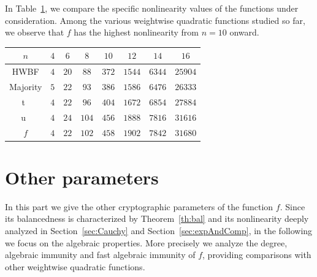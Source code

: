 \documentclass[11pt]{llncs}
\begin{document}
In Table~\ref{table:comparisonsNL}, we compare the specific nonlinearity values of the functions under consideration. Among the various weightwise quadratic functions studied so far, we observe that $f$ has the highest nonlinearity from $n=10$ onward.



\begin{table}[h]
	\centering
	\begin{tabular}{|c| c|c|c|c| c|c|c|}
		\hline
		$n$ & $4$  & $6$  & $8$  &  $10$ & $12$ & $14$ & $16$  \\
	\hline	
    	HWBF   & $4$  & $20$  & $88$  &  $372$ & $1544$ & $6344$ & $25904$  \\  	
		\hline
Majority   & $5$  & $22$  & $93$  &  $386$ & $1586$ & $6476$ & $26333$  \\
\hline
    	t~\cite{DAM:MeaOza24}   & $4$  & $22$  & $96$  &  $404$ & $1672$ & $6854$ & $27884$\\
\hline	
    	u~\cite{DAM:MeaOza24}   & $4$  & $24$  & $104$  &  $456$ & $1888$ & $7816$ & $31616$ \\
\hline				
		
		$f$  & $4$  & $22$  & $102$  &  $458$ & $1902$ & $7842$ & $31680$\\
\hline
	\end{tabular}
	\label{table:comparisonsNL}
\end{table}





\section{Other parameters}\label{sec:otherParameters}

In this part we give the other cryptographic parameters of the function $f$. Since its balancedness is characterized by Theorem~\ref{th:bal} and its nonlinearity deeply analyzed in Section~\ref{sec:Cauchy} and Section~\ref{sec:expAndComp}, in the following we focus on the algebraic properties. More precisely we analyze the degree, algebraic immunity and fast algebraic immunity of $f$, providing comparisons with other weightwise quadratic functions.
\end{document}

